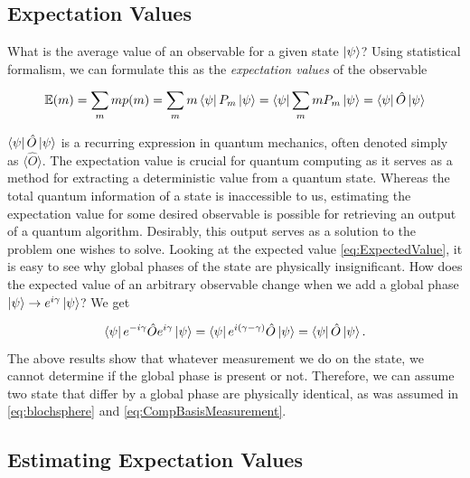 \subsection{Expectation Values}\label{sec:ExpectationValues}

What is the average value of an observable for a given state $\ket{\psi}$? Using statistical formalism, we can formulate this as the \emph{expectation values} of the observable

\begin{equation}\label{eq:ExpectedValue}
    \mathbb{E}(m) = \sum_m m p(m) = \sum_m m \bra{\psi}P_m\ket{\psi} = \bra{\psi}\sum_m m P_m\ket{\psi} = \bra{\psi}\hat{O}\ket{\psi}
\end{equation}

$\bra{\psi}\hat{O}\ket{\psi}$ is a recurring expression in quantum mechanics, often denoted simply as $\langle \hat{O} \rangle$. The expectation value is crucial for quantum computing as it serves as a method for extracting a deterministic value from a quantum state. Whereas the total quantum information of a state is inaccessible to us, estimating the expectation value for some desired observable is possible for retrieving an output of a quantum algorithm. Desirably, this output serves as a solution to the problem one wishes to solve. Looking at the expected value \autoref{eq:ExpectedValue}, it is easy to see why global phases of the state are physically insignificant. How does the expected value of an arbitrary observable change when we add a global phase $\ket{\psi} \rightarrow e^{i\gamma}\ket{\psi}$? We get

\begin{equation}\label{eq:ExpectedValue}
    \bra{\psi}e^{-i\gamma}
    \hat{O}e^{i\gamma}\ket{\psi} =\bra{\psi}e^{i(\gamma-\gamma) }\hat{O}\ket{\psi} = 
    \bra{\psi}\hat{O}\ket{\psi}.
\end{equation}
The above results show that whatever measurement we do on the state, we cannot determine if the global phase is present or not. Therefore, we can assume two state that differ by a global phase are physically identical, as was assumed in \autoref{eq:blochsphere} and \autoref{eq:CompBasisMeasurement}.

\subsection{Estimating Expectation Values}\label{sec:EstimatingExpectationValues}

